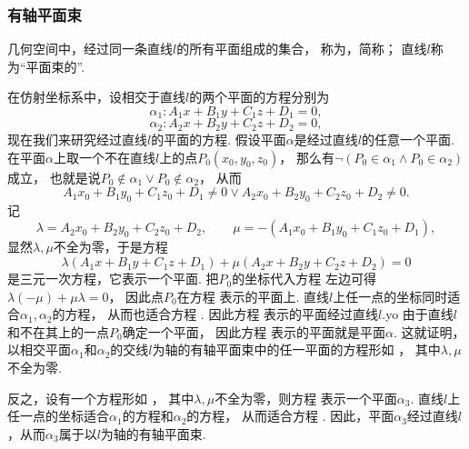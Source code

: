 \subsubsection{有轴平面束}
几何空间中，经过同一条直线\(l\)的所有平面组成的集合，
称为，简称；
直线\(l\)称为“平面束的”.

在仿射坐标系中，设相交于直线\(l\)的两个平面的方程分别为\[
	\alpha_1: A_1 x + B_1 y + C_1 z + D_1 = 0,
\]\[
	\alpha_2: A_2 x + B_2 y + C_2 z + D_2 = 0,
\]
现在我们来研究经过直线\(l\)的平面的方程.
假设平面\(\alpha\)是经过直线\(l\)的任意一个平面.
在平面\(\alpha\)上取一个不在直线\(l\)上的点\(P_0(x_0,y_0,z_0)\)，
那么有\(\neg(P_0 \in \alpha_1 \land P_0 \in \alpha_2)\)成立，
也就是说\(P_0 \notin \alpha_1 \lor P_0 \notin \alpha_2\)，
从而\[
	A_1 x_0 + B_1 y_0 + C_1 z_0 + D_1 \neq 0
	\lor
	A_2 x_0 + B_2 y_0 + C_2 z_0 + D_2 \neq 0.
\]
记\[
	\lambda = A_2 x_0 + B_2 y_0 + C_2 z_0 + D_2, \qquad
	\mu = -(A_1 x_0 + B_1 y_0 + C_1 z_0 + D_1),
\]
显然\(\lambda,\mu\)不全为零，于是方程
\begin{equation}\label{equation:解析几何.由两个相交平面确定的有轴平面束方程}
	\lambda	(A_1 x + B_1 y + C_1 z + D_1)
	+ \mu	(A_2 x + B_2 y + C_2 z + D_2) = 0
\end{equation}
是三元一次方程，它表示一个平面.
把\(P_0\)的坐标代入方程 
左边可得\(\lambda(-\mu)+\mu\lambda=0\)，
因此点\(P_0\)在方程  表示的平面上.
直线\(l\)上任一点的坐标同时适合\(\alpha_1,\alpha_2\)的方程，
从而也适合方程 .
因此方程 
表示的平面经过直线\(l\).yo
由于直线\(l\)和不在其上的一点\(P_0\)确定一个平面，
因此方程 
表示的平面就是平面\(\alpha\).
这就证明，以相交平面\(\alpha_1\)和\(\alpha_2\)的交线\(l\)为轴的有轴平面束中的任一平面的方程形如 ，
其中\(\lambda,\mu\)不全为零.

反之，设有一个方程形如 ，
其中\(\lambda,\mu\)不全为零，则方程 
表示一个平面\(\alpha_3\).
直线\(l\)上任一点的坐标适合\(\alpha_1\)的方程和\(\alpha_2\)的方程，
从而适合方程 .
因此，平面\(\alpha_3\)经过直线\(l\)，从而\(\alpha_3\)属于以\(l\)为轴的有轴平面束.

